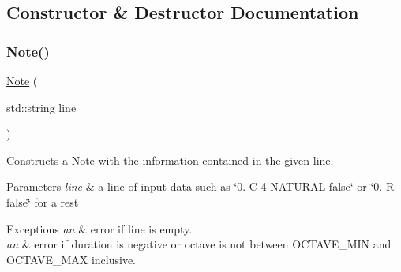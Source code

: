 \subsection{Constructor \& Destructor Documentation}
\mbox{\label{classNote_aa0709c7a84846e6ebcc352fad79d42ec}} 
\subsubsection{\texorpdfstring{Note()}{Note()}\hspace{0.1cm}{\footnotesize\ttfamily [1/2]}}
{\footnotesize\ttfamily \mbox{\hyperlink{classNote}{Note}} (\begin{DoxyParamCaption}\item[{std\+::string}]{line }\end{DoxyParamCaption})}



Constructs a \mbox{\hyperlink{classNote}{Note}} with the information contained in the given line. 


\begin{DoxyParams}{Parameters}
{\em line} & a line of input data such as \char`\"{}0. C 4 N\+A\+T\+U\+R\+A\+L false\char`\"{} or \char`\"{}0. R false\char`\"{} for a rest \\
\hline
\end{DoxyParams}

\begin{DoxyExceptions}{Exceptions}
{\em an} & error if line is empty. \\
\hline
{\em an} & error if duration is negative or octave is not between O\+C\+T\+A\+V\+E\+\_\+\+M\+IN and O\+C\+T\+A\+V\+E\+\_\+\+M\+AX inclusive. \\
\hline
\end{DoxyExceptions}
\mbox{\label{classNote_af366baa02ddd569bde363d084da394c6}} 
